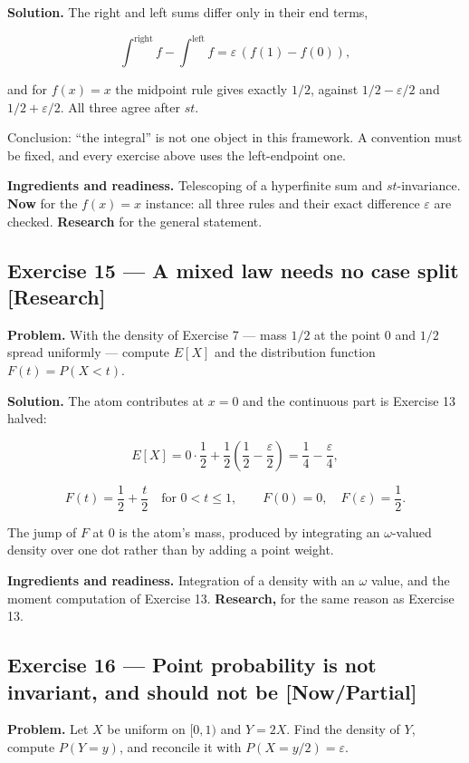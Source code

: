 \documentclass[11pt]{article}
\newcommand{\eps}{\varepsilon}
\renewcommand{\epsilon}{\varepsilon}
\begin{document}
\textbf{Solution.} The right and left sums differ only in their end terms,

\[
\int^{\text{right}}f-\int^{\text{left}}f=\epsilon\,(f(1)-f(0)),
\]

and for $f(x) = x$ the midpoint rule gives exactly $1/2$, against
$1/2 - \eps/2$ and $1/2 + \eps/2$. All three agree after $st$.

Conclusion: ``the integral'' is not one object in this framework. A convention
must be fixed, and every exercise above uses the left-endpoint one.

\textbf{Ingredients and readiness.} Telescoping of a hyperfinite sum and
$st$-invariance. \textbf{Now} for the $f(x) = x$ instance: all three rules and their
exact difference $\eps$ are checked. \textbf{Research} for the general
statement.


\subsection*{Exercise 15 --- A mixed law needs no case split \hfill \normalfont\small[Research]}

\textbf{Problem.} With the density of Exercise 7 --- mass $1/2$ at the point $0$ and
$1/2$ spread uniformly --- compute $E[X]$ and the distribution function
$F(t) = P(X < t)$.

\textbf{Solution.} The atom contributes at $x = 0$ and the continuous part is
Exercise 13 halved:

\[
E[X]=0\cdot\frac12+\frac12\left(\frac12-\frac\epsilon2\right)
=\frac14-\frac\epsilon4 ,
\]

\[
F(t)=\frac12+\frac t2 \quad\text{for } 0<t\le1,
\qquad F(0)=0,\quad F(\epsilon)=\frac12 .
\]

The jump of $F$ at $0$ is the atom's mass, produced by integrating an
$\omega$-valued density over one dot rather than by adding a point weight.

\textbf{Ingredients and readiness.} Integration of a density with an $\omega$ value,
and the moment computation of Exercise 13. \textbf{Research,} for the same reason
as Exercise 13.


\subsection*{Exercise 16 --- Point probability is not invariant, and should not be \hfill \normalfont\small[Now/Partial]}

\textbf{Problem.} Let $X$ be uniform on $[0,1)$ and $Y = 2X$. Find the density of
$Y$, compute $P(Y = y)$, and reconcile it with $P(X = y/2) = \eps$.
\end{document}
